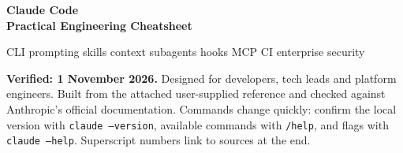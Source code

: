 \documentclass[9pt,a4paper]{extarticle}
\newcommand{\cmd}[1]{{\footnotesize\color{navy}\texttt{#1}}}
\begin{document}
{\color{navy}\fontsize{19}{21}\selectfont\bfseries Claude Code\\Practical Engineering Cheatsheet}\par\vspace{3pt}
{\color{slate}\small CLI \textbullet{} prompting \textbullet{} skills \textbullet{} context \textbullet{} subagents \textbullet{} hooks \textbullet{} MCP \textbullet{} CI \textbullet{} enterprise security}\par\vspace{3pt}
{\footnotesize\color{slate}\textbf{Verified: 1 November 2026.} Designed for developers, tech leads and platform engineers. Built from the attached user-supplied reference and checked against Anthropic's official documentation. Commands change quickly: confirm the local version with \cmd{claude --version}, available commands with \cmd{/help}, and flags with \cmd{claude --help}. Superscript numbers link to sources at the end.}
\end{document}
